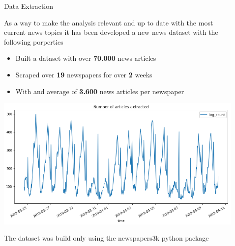 \documentclass[final]{beamer}
\newlength{\sepwid}
\newlength{\onecolwid}
\begin{document}
\begin{frame}[t]
\begin{columns}[t]
\begin{column}{\onecolwid}

\end{column} %

\begin{column}{\sepwid}\end{column} %

\begin{column}{\onecolwid} %



\begin{block}{Data Extraction}

As a way to make the analysis relevant and up to date with the most current news topics
it has been developed a new news dataset with the following porperties

\begin{itemize}
\item Built a dataset with over \textbf{70.000} news articles
\item Scraped over \textbf{19} newspapers for over \textbf{2} weeks
\item With and average of \textbf{3.600} news articles per newspaper
\end{itemize}

\hfill\includegraphics{log_extraction.png}\hspace*{\fill}

The dataset was build only using the newspapers3k python package

\end{block}


\end{column}
\end{columns}
\end{frame}
\end{document}
